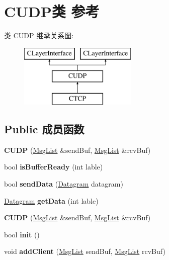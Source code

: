 \hypertarget{class_c_u_d_p}{}\section{C\+U\+D\+P类 参考}
\label{class_c_u_d_p}
类 C\+U\+DP 继承关系图\+:\begin{figure}[H]
\begin{center}
\leavevmode
\includegraphics[height=3.000000cm]{class_c_u_d_p}
\end{center}
\end{figure}
\subsection*{Public 成员函数}
\begin{DoxyCompactItemize}
\item 
\mbox{\label{class_c_u_d_p_a2eed7862494fbdc41005e5f536d2f74f}} 
{\bfseries C\+U\+DP} (\hyperlink{class_msg_list}{Msg\+List} \&send\+Buf, \hyperlink{class_msg_list}{Msg\+List} \&rcv\+Buf)
\item 
\mbox{\label{class_c_u_d_p_af595428bc531576d9859a9e0b84d03d9}} 
bool {\bfseries is\+Buffer\+Ready} (int lable)
\item 
\mbox{\label{class_c_u_d_p_a1f6e555ad4997b283e68ebfa7dc0d263}} 
bool {\bfseries send\+Data} (\hyperlink{class_datagram}{Datagram} datagram)
\item 
\mbox{\label{class_c_u_d_p_aa71e49c760769b55dc2251b244eb00ff}} 
\hyperlink{class_datagram}{Datagram} {\bfseries get\+Data} (int lable)
\item 
\mbox{\label{class_c_u_d_p_a2eed7862494fbdc41005e5f536d2f74f}} 
{\bfseries C\+U\+DP} (\hyperlink{class_msg_list}{Msg\+List} \&send\+Buf, \hyperlink{class_msg_list}{Msg\+List} \&rcv\+Buf)
\item 
\mbox{\label{class_c_u_d_p_a08619144028e752736166988369598c4}} 
bool {\bfseries init} ()
\item 
\mbox{\label{class_c_u_d_p_a32181d9f38654f9480193af29fc221eb}} 
void {\bfseries add\+Client} (\hyperlink{class_msg_list}{Msg\+List} send\+Buf, \hyperlink{class_msg_list}{Msg\+List} rcv\+Buf)
\end{DoxyCompactItemize}
